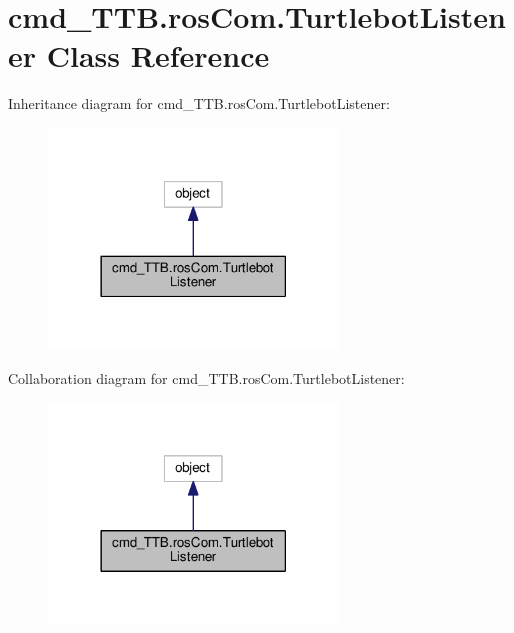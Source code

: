 \hypertarget{classcmd__TTB_1_1rosCom_1_1TurtlebotListener}{}\section{cmd\+\_\+\+T\+T\+B.\+ros\+Com.\+Turtlebot\+Listener Class Reference}
\label{classcmd__TTB_1_1rosCom_1_1TurtlebotListener}


Inheritance diagram for cmd\+\_\+\+T\+T\+B.\+ros\+Com.\+Turtlebot\+Listener\+:\nopagebreak
\begin{figure}[H]
\begin{center}
\leavevmode
\includegraphics[width=218pt]{classcmd__TTB_1_1rosCom_1_1TurtlebotListener__inherit__graph}
\end{center}
\end{figure}


Collaboration diagram for cmd\+\_\+\+T\+T\+B.\+ros\+Com.\+Turtlebot\+Listener\+:\nopagebreak
\begin{figure}[H]
\begin{center}
\leavevmode
\includegraphics[width=218pt]{classcmd__TTB_1_1rosCom_1_1TurtlebotListener__coll__graph}
\end{center}
\end{figure}
